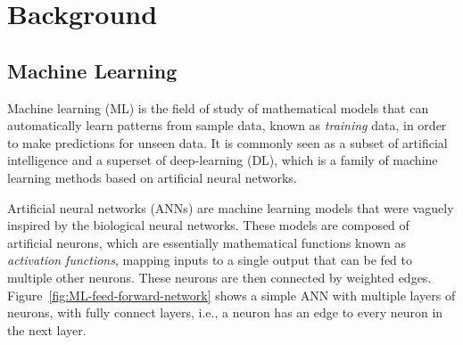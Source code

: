 \chapter{Background}








\section{Machine Learning}

Machine learning (ML) is the field of study of mathematical models that can automatically learn patterns from sample data, known as \textit{training} data, in order to make predictions for unseen data.
It is commonly seen as a subset of artificial intelligence and a superset of deep-learning (DL), which is a family of machine learning methods based on artificial neural networks.

Artificial neural networks (ANNs) are machine learning models that were vaguely inspired by the biological neural networks.
These models are composed of artificial neurons, which are essentially mathematical functions known as \textit{activation functions}, mapping inputs to a single output that can be fed to multiple other neurons.
These neurons are then connected by weighted edges.
Figure~\ref{fig:ML-feed-forward-network} shows a simple ANN with multiple layers of neurons, with fully connect layers, i.e., a neuron has an edge to every neuron in the next layer.


